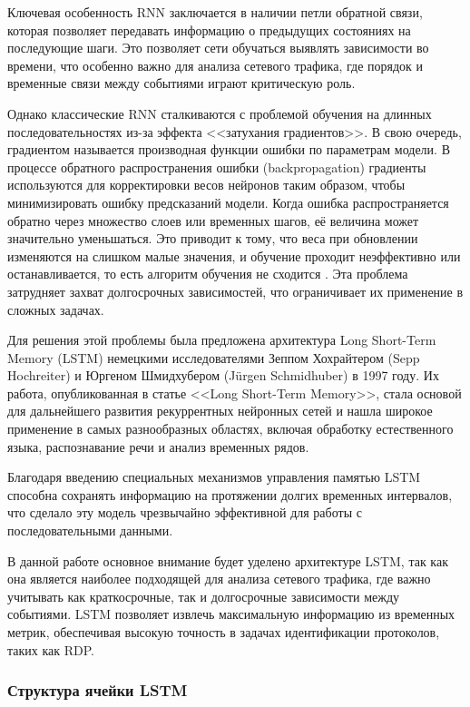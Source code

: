 \documentclass[bachelor, och, coursework]{SCWorks}
\begin{document}
  Ключевая особенность RNN заключается в наличии петли обратной связи, которая позволяет передавать информацию о предыдущих состояниях на последующие 
  шаги. Это позволяет сети обучаться выявлять зависимости во времени, что особенно важно для анализа сетевого трафика, где порядок и временные связи 
  между событиями играют критическую роль.  

  Однако классические RNN сталкиваются с проблемой обучения на длинных последовательностях из-за эффекта <<затухания градиентов>>. В свою очередь, градиентом 
  называется производная функции ошибки по параметрам модели. В процессе обратного распространения ошибки (backpropagation) градиенты используются 
  для корректировки весов нейронов таким образом, чтобы минимизировать ошибку предсказаний модели.
  Когда ошибка распространяется обратно через множество слоев или временных шагов, её величина может значительно уменьшаться. Это приводит к тому, что 
  веса при обновлении изменяются на слишком малые значения, и обучение проходит неэффективно или останавливается, то есть алгоритм обучения не сходится \cite{grad}. 
  Эта проблема затрудняет захват долгосрочных зависимостей, что ограничивает их применение в сложных задачах. 
  
  Для решения этой проблемы была предложена 
  архитектура Long Short-Term Memory (LSTM) немецкими исследователями Зеппом Хохрайтером (Sepp Hochreiter) и Юргеном Шмидхубером (Jürgen Schmidhuber) в 1997 году.
  Их работа, опубликованная в статье <<Long Short-Term Memory>>, стала основой для дальнейшего развития рекуррентных нейронных сетей и нашла широкое 
  применение в самых разнообразных областях, включая обработку естественного языка, распознавание речи и анализ временных рядов.

  Благодаря введению специальных механизмов управления памятью LSTM способна сохранять информацию на протяжении долгих временных интервалов, что сделало эту 
  модель чрезвычайно эффективной для работы с последовательными данными.

  В данной работе основное внимание будет уделено архитектуре LSTM, так как она является наиболее подходящей для анализа сетевого трафика, где важно учитывать как 
  краткосрочные, так и долгосрочные зависимости между событиями. LSTM позволяет извлечь максимальную информацию из временных метрик, обеспечивая высокую 
  точность в задачах идентификации протоколов, таких как RDP.

  \subsubsection{Структура ячейки LSTM}
\end{document}
